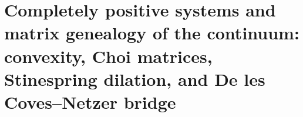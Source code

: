 





\chapter{Completely positive systems and matrix genealogy of the continuum: convexity, Choi matrices, Stinespring dilation, and De les Coves--Netzer bridge}
\label{chap:sucesor-102-26}
\label{chap:83-22}
\def\HMTGMCOperatorialAPP{1}
\def\HMTGMCDoubleProjection{1}
\def\HMTGMCContinuumMPS{1}
\def\HMTGMCOperatorialTower{1}

\let\HMTGMCOperatorialAPP\undefined
\let\HMTGMCDoubleProjection\undefined
\let\HMTGMCContinuumMPS\undefined
\let\HMTGMCOperatorialTower\undefined

